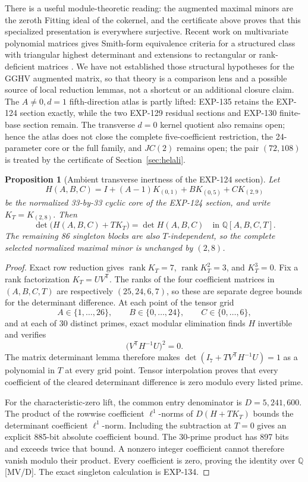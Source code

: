 \documentclass[11pt]{article}
\newtheorem{proposition}[theorem]{Proposition}
\theoremstyle{remark}
\newcommand{\Q}{\mathbb{Q}}
\begin{document}
There is a useful module-theoretic reading: the augmented maximal minors are
the zeroth Fitting ideal of the cokernel, and the certificate above proves
that this specialized presentation is everywhere surjective. Recent work on
multivariate polynomial matrices gives Smith-form equivalence criteria for a
structured class with triangular highest determinant and extensions to
rectangular or rank-deficient matrices \cite{LuRuanWangXiao2026}. We have
not established those structural hypotheses for the GGHV augmented matrix,
so that theory is a comparison lens and a possible source of local reduction
lemmas, not a shortcut or an additional closure claim. The \(A\ne0,d=1\)
fifth-direction atlas is partly lifted: EXP-135 retains the EXP-124 section
exactly, while the two EXP-129 residual sections and EXP-130 finite-base
section remain. The transverse \(d=0\) kernel quotient also remains open;
hence the atlas does not close the complete five-coefficient restriction, the 24-parameter core or the full
family, and \(JC(2)\) remains open; the pair \((72,108)\) is treated by the certificate of Section~\ref{sec:helali}.

\begin{proposition}[Ambient transverse inertness of the EXP-124 section]
\label{prop:exp135-inert}
Let
\[
 H(A,B,C)=I+(A-1)K_{(0,1)}+B K_{(0,5)}+C K_{(2,9)}
\]
be the normalized 33-by-33 cyclic core of the EXP-124 section, and
write \(K_T=K_{(2,8)}\). Then
\[
 \det\!\bigl(H(A,B,C)+T K_T\bigr)=\det H(A,B,C)
 \quad\text{in }\Q[A,B,C,T].
\]
The remaining 86 singleton blocks are also \(T\)-independent, so the complete
selected normalized maximal minor is unchanged by \((2,8)\).
\end{proposition}

\begin{proof}
Exact row reduction gives
\(\operatorname{rank}K_T=7\),
\(\operatorname{rank}K_T^2=3\), and \(K_T^3=0\). Fix a rank factorization
\(K_T=UV^{\mathsf T}\). The ranks of the four coefficient matrices in
\((A,B,C,T)\) are respectively \((25,24,6,7)\), so these are separate degree
bounds for the determinant difference. At each point of the tensor grid
\[
 A\in\{1,\ldots,26\},\qquad B\in\{0,\ldots,24\},\qquad
 C\in\{0,\ldots,6\},
\]
and at each of 30 distinct primes, exact modular elimination finds \(H\)
invertible and verifies
\[
 \bigl(V^{\mathsf T}H^{-1}U\bigr)^2=0.
\]
The matrix determinant lemma therefore makes
\(\det(I_7+T V^{\mathsf T}H^{-1}U)=1\) as a polynomial in \(T\) at every
grid point. Tensor interpolation proves that every coefficient of the
cleared determinant difference is zero modulo every listed prime.

For the characteristic-zero lift, the common entry denominator is
\(D=5{,}241{,}600\). The product of the rowwise coefficient \(\ell^1\)-norms
of \(D(H+T K_T)\) bounds the determinant coefficient \(\ell^1\)-norm.
Including the subtraction at \(T=0\) gives an explicit 885-bit absolute
coefficient bound. The 30-prime product has 897 bits and exceeds twice that
bound. A nonzero integer coefficient cannot therefore vanish modulo their
product. Every coefficient is zero, proving the identity over \(\Q\) [MV/D].
The exact singleton calculation is EXP-134.
\end{proof}
\end{document}
